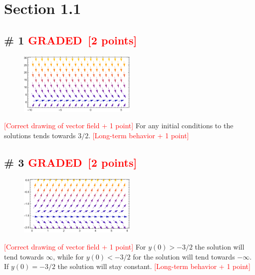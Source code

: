 \documentclass[12pt,letterpaper]{exam}
\newcommand{\grade}{\textcolor{red}{GRADED}}
\newcommand{\pts}[1]{\textcolor{red}{[#1]}}
\begin{document}
\section*{Section 1.1}

\subsection*{\# 1 \grade \, \pts{2 points}}

 \begin{figure}[h!]
\centering
\includegraphics[width=0.5\textwidth]{./1p1_1.pdf}
\end{figure}
\noindent
\pts{Correct drawing of vector field + 1 point}
For any initial conditions to the solutions tends towards $3/2$. 
\pts{Long-term behavior + 1 point}

\subsection*{\# 3 \grade \, \pts{2 points}}

 \begin{figure}[h!]
\centering
\includegraphics[width=0.5\textwidth]{./1p1_3.pdf}
\end{figure}
\noindent \pts{Correct drawing of vector field + 1 point}
For $y(0)>-3/2$ the solution will tend towards $\infty$, while for $y(0)<-3/2$ for the solution will tend towards  $-\infty$. If $y(0) = -3/2$ the solution will stay constant. 
\pts{Long-term behavior + 1 point}
\end{document}
